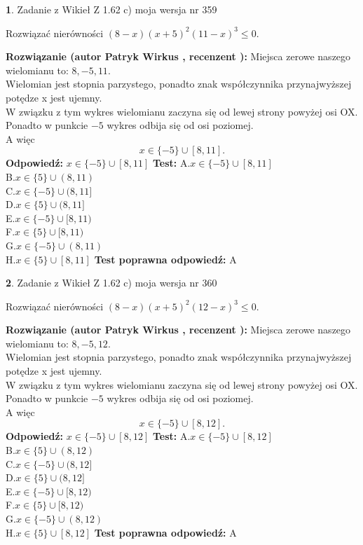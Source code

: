 \documentclass[12pt, a4paper]{article}
\theoremstyle{definition} %
\newtheorem{zad}{}
\newcommand{\zadStart}[1]{\begin{zad}#1\newline}
\newcommand{\zadStop}{\end{zad}}
\newcommand{\rozwStart}[2]{\noindent \textbf{Rozwiązanie (autor #1 , recenzent #2): }\newline}
\newcommand{\rozwStop}{\newline}
\newcommand{\odpStart}{\noindent \textbf{Odpowiedź:}\newline}
\newcommand{\odpStop}{\newline}
\newcommand{\testStart}{\noindent \textbf{Test:}\newline}
\newcommand{\testStop}{\newline}
\newcommand{\kluczStart}{\noindent \textbf{Test poprawna odpowiedź:}\newline}
\newcommand{\kluczStop}{\newline}
\begin{document}
\zadStart{Zadanie z Wikieł Z 1.62 c) moja wersja nr 359}

Rozwiązać nierówności $(8-x)(x+5)^{2}(11-x)^{3}\le0$.
\zadStop
\rozwStart{Patryk Wirkus}{}
Miejsca zerowe naszego wielomianu to: $8, -5, 11$.\\
Wielomian jest stopnia parzystego, ponadto znak współczynnika przy\linebreak najwyższej potędze x jest ujemny.\\ W związku z tym wykres wielomianu zaczyna się od lewej strony powyżej osi OX.\\
Ponadto w punkcie $-5$ wykres odbija się od osi poziomej.\\
A więc $$x \in \{-5\} \cup [8,11].$$
\rozwStop
\odpStart
$x \in \{-5\} \cup [8,11]$
\odpStop
\testStart
A.$x \in \{-5\} \cup [8,11]$\\
B.$x \in \{5\} \cup (8,11)$\\
C.$x \in \{-5\} \cup (8,11]$\\
D.$x \in \{5\} \cup (8,11]$\\
E.$x \in \{-5\} \cup [8,11)$\\
F.$x \in \{5\} \cup [8,11)$\\
G.$x \in \{-5\} \cup (8,11)$\\
H.$x \in \{5\} \cup [8,11]$
\testStop
\kluczStart
A
\kluczStop



\zadStart{Zadanie z Wikieł Z 1.62 c) moja wersja nr 360}

Rozwiązać nierówności $(8-x)(x+5)^{2}(12-x)^{3}\le0$.
\zadStop
\rozwStart{Patryk Wirkus}{}
Miejsca zerowe naszego wielomianu to: $8, -5, 12$.\\
Wielomian jest stopnia parzystego, ponadto znak współczynnika przy\linebreak najwyższej potędze x jest ujemny.\\ W związku z tym wykres wielomianu zaczyna się od lewej strony powyżej osi OX.\\
Ponadto w punkcie $-5$ wykres odbija się od osi poziomej.\\
A więc $$x \in \{-5\} \cup [8,12].$$
\rozwStop
\odpStart
$x \in \{-5\} \cup [8,12]$
\odpStop
\testStart
A.$x \in \{-5\} \cup [8,12]$\\
B.$x \in \{5\} \cup (8,12)$\\
C.$x \in \{-5\} \cup (8,12]$\\
D.$x \in \{5\} \cup (8,12]$\\
E.$x \in \{-5\} \cup [8,12)$\\
F.$x \in \{5\} \cup [8,12)$\\
G.$x \in \{-5\} \cup (8,12)$\\
H.$x \in \{5\} \cup [8,12]$
\testStop
\kluczStart
A
\kluczStop
\end{document}
